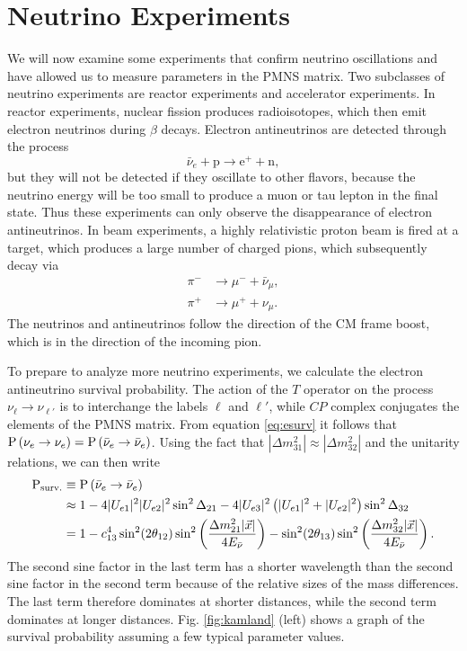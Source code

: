 \section{Neutrino Experiments}
We will now examine some experiments that confirm neutrino oscillations and
have allowed us to measure parameters in the PMNS matrix.
Two subclasses of neutrino experiments are reactor experiments
and accelerator experiments. In reactor experiments, nuclear fission produces
radioisotopes, which then emit electron neutrinos during $\beta$ decays.
Electron antineutrinos are detected through the process
\begin{equation}
  \label{eq:betadecay}
  \bar{\nu}_e+\text{p}\to\text{e}^++\text{n},
\end{equation}
but they will not be detected if they oscillate to other flavors, because
the neutrino energy will be too small to produce a muon or tau lepton in
the final state. Thus these experiments can only observe the disappearance
of electron antineutrinos. In beam experiments, a highly relativistic
proton beam is fired at a target, which produces a large number of charged
pions, which subsequently decay via
\begin{equation}
  \begin{aligned}
    \pi^-&\to\mu^-+\bar{\nu}_\mu, \\
    \pi^+&\to\mu^++\nu_\mu.
  \end{aligned}
\end{equation}
The neutrinos and antineutrinos follow the direction of the CM frame boost,
which is in the direction of the incoming pion.

To prepare to analyze more neutrino experiments, we calculate the
electron antineutrino survival probability.
The action of the $T$ operator on the process $\nu_\ell\to\nu_{\ell'}$ is
to interchange the labels $\ell$ and $\ell'$, while $CP$ complex conjugates
the elements of the PMNS matrix. From equation \eqref{eq:esurv} it follows
that $\operatorname{P}\left(\nu_e\to\nu_e\right)=\operatorname{P}\left(\bar{\nu}_e\to\bar{\nu}_e\right)$. Using the fact
that $|\Delta m_{31}^2|\approx|\Delta m_{32}^2|$ and the unitarity relations,
we can then write
\begin{equation}
  \label{eq:prb}
  \begin{aligned}
    {\rm P}_{\rm surv.}&\equiv\operatorname{P}\left(\bar{\nu}_e\to\bar{\nu}_e\right)\\
      &\approx 1-4|U_{e1}|^2|U_{e2}|^2\sin^2\Delta_{21}
              -4|U_{e3}|^2\left(|U_{e1}|^2+|U_{e2}|^2\right)\sin^2\Delta_{32}
       \\ 
      &= 1-c_{13}^4\sin^2(2\theta_{12})
           \sin^2\left(\frac{\Delta m_{21}^2 |\vec{x}|}{4E_{\bar{\nu}}}
           \right) -\sin^2(2\theta_{13})
           \sin^2\left(\frac{\Delta m_{32}^2 |\vec{x}|}{4E_{\bar{\nu}}}
           \right).
  \end{aligned}
\end{equation}
The second sine factor in the last term has a shorter wavelength than the
second sine factor in the second term because of the relative sizes of the
mass differences. The last term therefore dominates at shorter distances,
while the second term dominates at longer distances. Fig. \ref{fig:kamland}
(left) shows a graph of the survival probability assuming a few typical 
parameter values.

